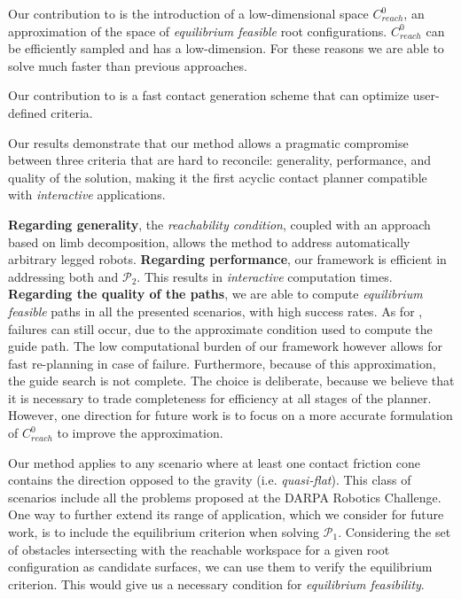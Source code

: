 \documentclass[journal]{IEEEtran}
\newcommand{\equilibriumfeasibility}[0]{\glslink{equilibrium feasible}{\textit{equilibrium feasibility}}}	%
\newcommand{\gls}[1]{\textit{#1}}
\newcommand{\glslink}[2]{{#2}}
\providecommand{\DIFaddbegin}{\protect\color{blue}} %
\providecommand{\DIFaddend}{\protect\color{black}} %
\begin{document}
Our contribution to \Pa is the introduction of a low-dimensional space $C_{reach}^0$, an approximation of the space of \gls{equilibrium feasible} root configurations.
$C_{reach}^0$ can be efficiently sampled and has a low-dimension. For these reasons we are able to solve \Pa much faster than previous approaches.

Our contribution to \Pb is a fast contact generation scheme that can optimize user-defined criteria.

Our results demonstrate that our method allows a pragmatic compromise between three 
criteria that are hard to reconcile: generality, performance, and quality of the solution, making it the first acyclic contact
planner compatible with \gls{interactive} applications.
\DIFaddbegin 

\DIFaddend %
\textbf{Regarding generality}, the \textit{reachability condition}, coupled with an approach based on limb decomposition, 
allows the method to address automatically arbitrary legged robots.
%
\textbf{Regarding performance}, our framework is efficient in addressing both \Pa and $\mathcal{P}_2$. This results in \gls{interactive} computation times.
%
\textbf{Regarding the quality of the paths}, we are able to compute
\gls{equilibrium feasible} paths in all the presented scenarios, with high success rates.
As for \cite{Bouyarmane2009}, failures can still occur, due to the approximate condition used to compute the guide path.
The low computational burden of our framework however allows for fast re-planning in case of failure.
Furthermore, because of this approximation, the guide search is not complete. The choice is deliberate, because we believe
that it is necessary to trade completeness for efficiency at all stages of the planner.
However, one direction for future work is to focus on a more accurate formulation of $C_{reach}^0$ to improve
the approximation.

Our method applies to any scenario where at least one contact friction cone contains
the direction opposed to the gravity (i.e. \textit{quasi-flat}). This class of scenarios include all the problems proposed at the DARPA Robotics Challenge.
One way to further extend its range of application, which we consider for future work, is to include the equilibrium criterion when solving $\mathcal{P}_1$.
Considering the set of obstacles intersecting with the reachable workspace for a given root configuration as candidate surfaces, we can use them to verify the equilibrium criterion.
This would give us a necessary condition for \equilibriumfeasibility. %
\end{document}
